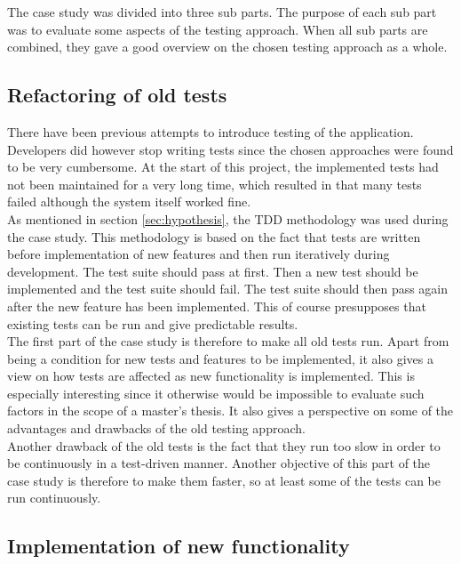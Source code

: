 
The case study was divided into three sub parts. The purpose of each sub
part was to evaluate some aspects of the testing approach. When all sub
parts are combined, they gave a good overview on the chosen testing
approach as a whole.\\


\subsection{Refactoring of old tests}
\label{sec:casestudy_1}

There have been previous attempts to introduce testing of the
application. Developers did however stop writing tests since the chosen
approaches were found to be very cumbersome. At the start of this
project, the implemented tests had not been maintained for a very long
time, which resulted in that many tests failed although the system
itself worked fine.\\

As mentioned in section \ref{sec:hypothesis}, the TDD methodology was
used during the case study. This methodology is based on the fact that
tests are written before implementation of new features and then run
iteratively during development. The test suite should pass at first.
Then a new test should be implemented and the test suite should fail.
The test suite should then pass again after the new feature has been
implemented. This of course presupposes that existing tests can be run
and give predictable results.\\

The first part of the case study is therefore to make all old tests run.
Apart from being a condition for new tests and features to be
implemented, it also gives a view on how tests are affected as new
functionality is implemented. This is especially interesting since it
otherwise would be impossible to evaluate such factors in the scope of a
master's thesis. It also gives a perspective on some of the advantages
and drawbacks of the old testing approach.\\

Another drawback of the old tests is the fact that they run too slow in
order to be continuously in a test-driven manner. Another objective of
this part of the case study is therefore to make them faster, so at
least some of the tests can be run continuously.\\


\subsection{Implementation of new functionality}
\label{sec:casestudy_2}

